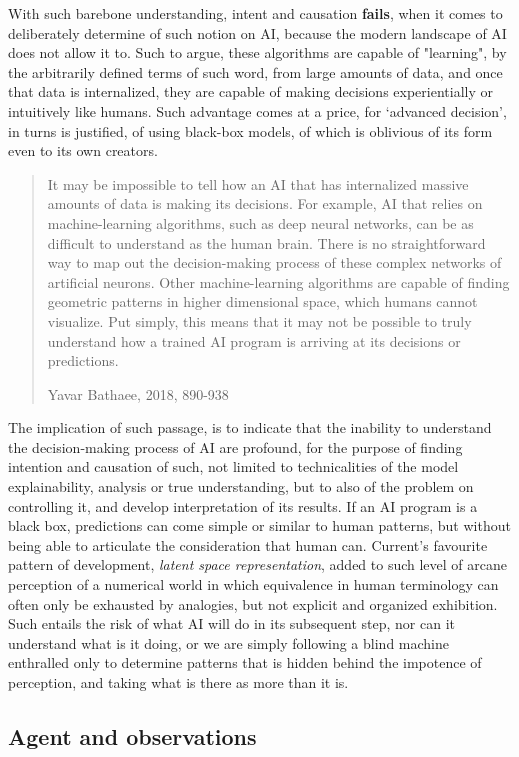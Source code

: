 With such barebone understanding, intent and causation \textbf{fails}, when it comes to deliberately determine of such notion on AI, because the modern landscape of AI does not allow it to. Such to argue, these algorithms are capable of "learning", by the arbitrarily defined terms of such word, from large amounts of data, and once that data is internalized, they are capable of making decisions experientially or intuitively like humans. Such advantage comes at a price, for `advanced decision', in turns is justified, of using black-box models, of which is oblivious of its form even to its own creators. 
\blockquote[Yavar Bathaee, 2018, 890-938]{It may be impossible to tell how an AI that has internalized massive amounts of data is making its decisions. For example, AI that relies on machine-learning algorithms, such as deep neural networks, can be as difficult to understand as the human brain. There is no straightforward way to map out the decision-making process of these complex networks of artificial neurons. Other machine-learning algorithms are capable of finding geometric patterns in higher dimensional space, which humans cannot visualize. Put simply, this means that it may not be possible to truly understand how a trained AI program is arriving at its decisions or predictions.}
The implication of such passage, is to indicate that the inability to understand the decision-making process of AI are profound, for the purpose of finding intention and causation of such, not limited to technicalities of the model explainability, analysis or true understanding, but to also of the problem on controlling it, and develop interpretation of its results. If an AI program is a black box, predictions can come simple or similar to human patterns, but without being able to articulate the consideration that human can. Current's favourite pattern of development, \textit{latent space representation}, added to such level of arcane perception of a numerical world in which equivalence in human terminology can often only be exhausted by analogies, but not explicit and organized exhibition. Such entails the risk of what AI will do in its subsequent step, nor can it understand what is it doing, or we are simply following a blind machine enthralled only to determine patterns that is hidden behind the impotence of perception, and taking what is there as more than it is. 

\subsection{Agent and observations}

